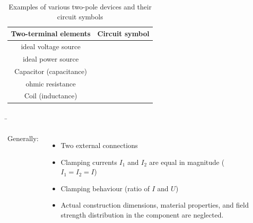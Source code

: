 \begin{frame}
{		\begin{center}
			\renewcommand{\tablename}{Table}
			\begin{table}[h!]
				\centering
				\begin{tabular}{|c|c|}
					\hline
					Two-terminal elements                 & Circuit symbol                                               \\ \hline
					ideal voltage source  &  \\ \hline
					ideal power source     &      \\ \hline
					Capacitor (capacitance) &             \\ \hline
					ohmic resistance     &     \\ \hline
					Coil (inductance)    &                   \\ \hline
				\end{tabular}
				\caption{Examples of various two-pole devices and their circuit symbols}
				\label{tab:schaltzeichen}
			\end{table}
		\end{center}
	}
	
	\b{
	
		\begin{columns}
			
			Generally:\\
			\phantom{.}\\
			\begin{itemize}
				\item Two external connections
				\item Clamping currents $I_1$ and $I_2$ are equal in magnitude ($I_1=I_2 = I$)
				\item Clamping behaviour (ratio of $I$ and $U$)
                \item Actual construction dimensions, material properties, and field strength distribution in the component are neglected.
			\end{itemize}
			
			
			\vspace{10pt}
			
			
			

\end{columns}}
\end{frame}
